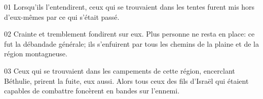 01 Lorsqu'ils l’entendirent, ceux qui se trouvaient dans les tentes furent mis hors d'eux-mêmes par ce qui s'était passé.

02 Crainte et tremblement fondirent sur eux. Plus personne ne resta en place: ce fut la débandade générale; ils s'enfuirent par tous les chemins de la plaine et de la région montagneuse.

03 Ceux qui se trouvaient dans les campements de cette région, encerclant Béthulie, prirent la fuite, eux aussi. Alors tous ceux des fils d'Israël qui étaient capables de combattre foncèrent en bandes sur l'ennemi.
